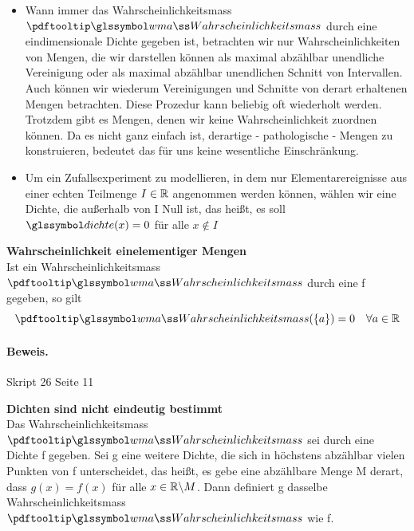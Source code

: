 \begin{bem}
     
    \begin{itemize}
        \item Wann immer das Wahrscheinlichkeitsmass $\pe$ durch eine eindimensionale Dichte gegeben ist,
        betrachten wir nur Wahrscheinlichkeiten von Mengen, die wir darstellen können als maximal
        abzählbar unendliche Vereinigung oder als maximal abzählbar unendlichen Schnitt von Intervallen.
        Auch können wir wiederum Vereinigungen und Schnitte von derart erhaltenen Mengen
        betrachten.
        Diese Prozedur kann beliebig oft wiederholt werden.
        Trotzdem gibt es Mengen, denen wir keine Wahrscheinlichkeit zuordnen können.
        Da es nicht
        ganz einfach ist, derartige - pathologische - Mengen zu konstruieren, bedeutet das für uns keine
        wesentliche Einschränkung.
        \item Um ein Zufallsexperiment zu modellieren, in dem nur Elementarereignisse aus einer echten
        Teilmenge $I \in \mathbb{R}$ angenommen werden können, wählen wir eine Dichte, die außerhalb von I
        Null ist, das heißt, es soll $\dcht (x) = 0$ für alle $x \notin I$
    \end{itemize}
\end{bem}

\begin{lem}
    \textbf{Wahrscheinlichkeit einelementiger Mengen}  \\
    Ist ein Wahrscheinlichkeitsmass $\pe$ durch eine \dichte f gegeben, so gilt
    \[
        \pe(\{a\}) = 0 \quad \forall a \in \rz
    \]
    \paragraph{Beweis.} Skript 26 Seite 11 %
\end{lem}

\begin{kor}
    \textbf{Dichten sind nicht eindeutig bestimmt}  \\
    Das Wahrscheinlichkeitsmass $\pe$ sei durch eine Dichte f gegeben.
    Sei g eine weitere Dichte, die sich in
    höchstens abzählbar vielen Punkten von f unterscheidet, das heißt, es gebe eine abzählbare Menge M
    derart, dass $g(x) = f (x)$ für alle $x \in \mathbb{R} \backslash M$.
    Dann definiert g dasselbe Wahrscheinlichkeitsmass $\pe$
    wie f.
\end{kor}

